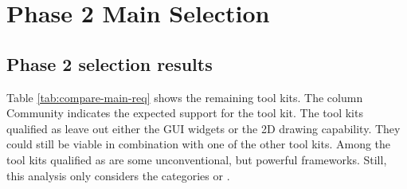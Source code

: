 \section{Phase 2 Main Selection}

\subsection{Phase 2 selection results}

Table \ref{tab:compare-main-req} shows the remaining tool kits. The column {\sc
Community} indicates the expected support for the tool kit.  The tool kits
qualified as  leave out either the GUI widgets or the 2D drawing
capability. They could still be viable in combination with one of the other
tool kits. Among the tool kits qualified as  are some unconventional,
but powerful frameworks. Still, this analysis only considers the categories
 or .

